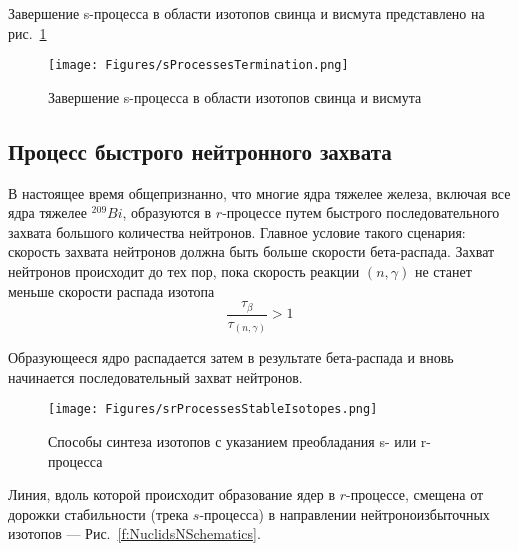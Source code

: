 \documentclass[a5paper,openany]{book}
\begin{document}
Завершение s-процесса в области изотопов свинца и висмута представлено на рис.~\ref{f:sProcessesTermination}
\begin{figure}[h] 
	\centering\small
	\unitlength=1mm
		\texttt{[image: Figures/sProcessesTermination.png]}
	\caption{Завершение s-процесса в области изотопов свинца и висмута \cite{s-processTermination2004}} 
	\label{f:sProcessesTermination}
\end{figure}

\subsection{Процесс быстрого нейтронного захвата}  \label{s:rProcess}

В настоящее время общепризнанно, что многие ядра тяжелее железа, включая все ядра тяжелее $^{209}Bi$, образуются в $r$-процессе путем  быстрого последовательного захвата большого количества нейтронов. Главное условие такого сценария: скорость захвата нейтронов должна быть больше скорости бета-распада. Захват нейтронов происходит до тех пор, пока скорость реакции $(n, \gamma)$ не станет меньше скорости распада изотопа
\begin{equation}\label{rprocess}
\frac{\tau_{\beta}} {\tau_{(n, \gamma)}}  >  1 
\end{equation}


Образующееся ядро распадается затем в результате бета-распада и вновь начинается последовательный захват нейтронов.

\begin{figure}[ht] 
	\centering\small
	\unitlength=1mm
	\texttt{[image: Figures/srProcessesStableIsotopes.png]} 
	\caption{Способы синтеза изотопов с указанием преобладания s- или r-процесса \cite{r-process2007}} 
	\label{f:srProcessesStableIsotopes}
\end{figure}


Линия, вдоль которой происходит образование ядер в $r$-процессе, смещена от дорожки стабильности (трека $s$-процесса) в направлении нейтроноизбыточных изотопов --- Рис.~\ref{f:NuclidsNSchematics}.
\end{document}

